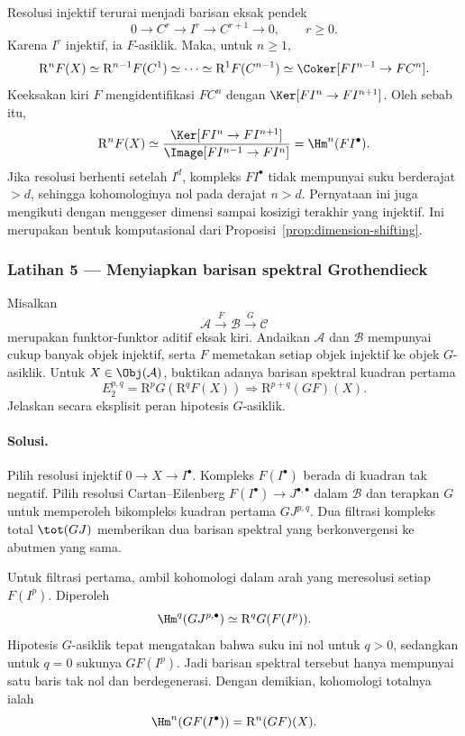 Resolusi injektif terurai menjadi barisan eksak pendek
\[
	0\to C^r\to I^r\to C^{r+1}\to0,
	\qquad r\geq0.
\]
Karena $I^r$ injektif, ia $F$-asiklik. Maka, untuk $n\geq1$,
\[
	\mathrm{R}^nF(X)\simeq\mathrm{R}^{n-1}F(C^1)\simeq\cdots
	\simeq\mathrm{R}^1F(C^{n-1})
	\simeq\Coker[FI^{n-1}\to FC^n].
\]
Keeksakan kiri $F$ mengidentifikasi $FC^n$ dengan
$\Ker[FI^n\to FI^{n+1}]$. Oleh sebab itu,
\[
	\mathrm{R}^nF(X)\simeq
	\frac{\Ker[FI^n\to FI^{n+1}]}
	{\Image[FI^{n-1}\to FI^n]}
	=\Hm^n(FI^\bullet).
\]
Jika resolusi berhenti setelah $I^d$, kompleks $FI^\bullet$ tidak mempunyai
suku berderajat $>d$, sehingga kohomologinya nol pada derajat $n>d$.
Pernyataan ini juga mengikuti dengan menggeser dimensi sampai kosizigi
terakhir yang injektif. Ini merupakan bentuk komputasional dari
Proposisi~\ref{prop:dimension-shifting}.

\subsubsection*{Latihan 5 --- Menyiapkan barisan spektral Grothendieck}
\hypertarget{o014.mastery.derived-spectral.002.ex05}{ }
\label{mastery:derived-spectral-002-ex05}

Misalkan
\[
	\mathcal{A}\xrightarrow{F}\mathcal{B}\xrightarrow{G}\mathcal{C}
\]
merupakan funktor-funktor aditif eksak kiri. Andaikan $\mathcal{A}$ dan
$\mathcal{B}$ mempunyai cukup banyak objek injektif, serta $F$ memetakan
setiap objek injektif ke objek $G$-asiklik. Untuk $X\in\Obj(\mathcal{A})$,
buktikan adanya barisan spektral kuadran pertama
\[
	E_2^{p,q}=\mathrm{R}^pG(\mathrm{R}^qF(X))
	\Rightarrow\mathrm{R}^{p+q}(GF)(X).
\]
Jelaskan secara eksplisit peran hipotesis $G$-asiklik.

\paragraph{Solusi.}
\hypertarget{o014.mastery.derived-spectral.002.sol05}{ }
Pilih resolusi injektif $0\to X\to I^\bullet$. Kompleks
$F(I^\bullet)$ berada di kuadran tak negatif. Pilih resolusi
Cartan--Eilenberg $F(I^\bullet)\to J^{\bullet,\bullet}$ dalam
$\mathcal{B}$ dan terapkan $G$ untuk memperoleh bikompleks kuadran pertama
$GJ^{p,q}$. Dua filtrasi kompleks total
$\tot(GJ)$ memberikan dua barisan spektral yang berkonvergensi ke abutmen yang sama.

Untuk filtrasi pertama, ambil kohomologi dalam arah yang meresolusi setiap
$F(I^p)$. Diperoleh
\[
	\Hm^q(GJ^{p,\bullet})
	\simeq\mathrm{R}^qG(F(I^p)).
\]
Hipotesis $G$-asiklik tepat mengatakan bahwa suku ini nol untuk $q>0$,
sedangkan untuk $q=0$ sukunya $GF(I^p)$. Jadi barisan spektral tersebut hanya
mempunyai satu baris tak nol dan berdegenerasi. Dengan demikian, kohomologi totalnya
ialah
\[
	\Hm^n(GF(I^\bullet))=\mathrm{R}^n(GF)(X).
\]

